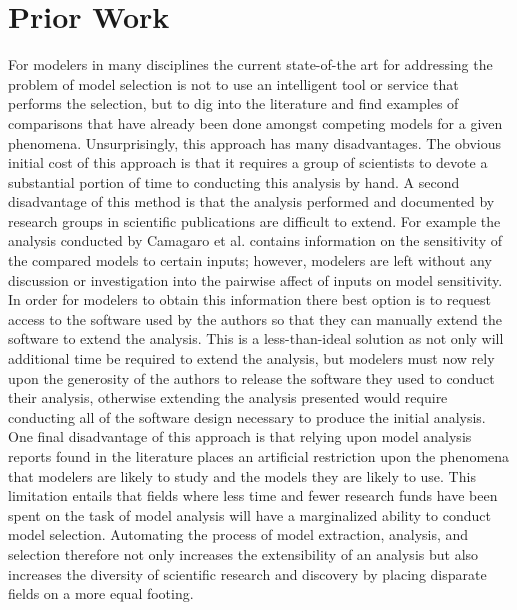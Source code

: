 \section{Prior Work\label{sec:prior_work}}
For modelers in many disciplines the current state-of-the art for addressing the problem of model selection is not to use an intelligent tool or service that performs the selection, but to dig into the literature and find examples of comparisons that have already been done amongst competing models for a given phenomena. Unsurprisingly, this approach has many disadvantages. The obvious initial cost of this approach is that it requires a group of scientists to devote a substantial portion of time to conducting this analysis by hand. A second disadvantage of this method is that the analysis performed and documented by research groups in scientific publications are difficult to extend. For example the analysis conducted by Camagaro et al. \cite{camargo2016six} contains information on the sensitivity of the compared models to certain inputs; however, modelers are left without any discussion or investigation into the pairwise affect of inputs on model sensitivity. In order for modelers to obtain this information there best option is to request access to the software used by the authors so that they can manually extend the software to extend the analysis. This is a less-than-ideal solution as not only will additional time be required to extend the analysis, but modelers must now rely upon the generosity of the authors to release the software they used to conduct their analysis, otherwise extending the analysis presented would require conducting all of the software design necessary to produce the initial analysis. One final disadvantage of this approach is that relying upon model analysis reports found in the literature places an artificial restriction upon the phenomena that modelers are likely to study and the models they are likely to use. This limitation entails that fields where less time and fewer research funds have been spent on the task of model analysis will have a marginalized ability to conduct model selection. Automating the process of model extraction, analysis, and selection therefore not only increases the extensibility of an analysis but also increases the diversity of scientific research and discovery by placing disparate fields on a more equal footing.

